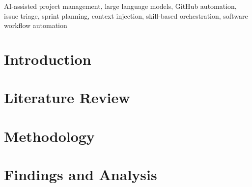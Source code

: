 \documentclass[conference]{IEEEtran}
\begin{document}
\begin{IEEEkeywords}
AI-assisted project management, large language models, GitHub
automation, issue triage, sprint planning, context injection,
skill-based orchestration, software workflow automation
\end{IEEEkeywords}

\section{Introduction}
\label{sec:intro}


\section{Literature Review}
\label{sec:lit}


\section{Methodology}
\label{sec:method}


\section{Findings and Analysis}
\label{sec:findings}

\end{document}
